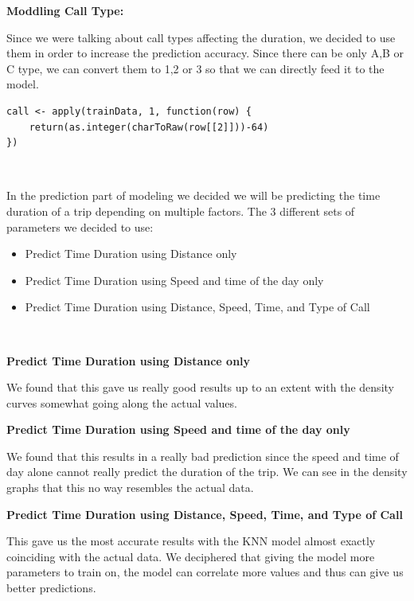 \documentclass[11pt]{article}
\begin{document}
\textbf{Moddling Call Type:}
\par
Since we were talking about call types affecting the duration, we decided to use them in order to increase the prediction accuracy. Since there can be only A,B or C type, we can convert them to 1,2 or 3 so that we can directly feed it to the model.

\begin{lstlisting}
call <- apply(trainData, 1, function(row) {
	return(as.integer(charToRaw(row[[2]]))-64)
})
\end{lstlisting}

\\
\par
In the prediction part of modeling we decided we will be predicting the time duration of a trip depending on multiple factors. The 3 different sets of parameters we decided to use:
\begin{itemize}
	\item Predict Time Duration using Distance only
	\item Predict Time Duration using Speed and time of the day only
	\item Predict Time Duration using Distance, Speed, Time, and Type of Call
\end{itemize}

\\
\par
\textbf{Predict Time Duration using Distance only}
\par
We found that this gave us really good results up to an extent with the density curves somewhat going along the actual values.

\textbf{Predict Time Duration using Speed and time of the day only}
\par
We found that this results in a really bad prediction since the speed and time of day alone cannot really predict the duration of the trip. We can see in the density graphs that this no way resembles the actual data.

\textbf{Predict Time Duration using Distance, Speed, Time, and Type of Call}
\par
This gave us the most accurate results with the KNN model almost exactly coinciding with the actual data. We deciphered that giving the model more parameters to train on, the model can correlate more values and thus can give us better predictions.
\end{document}
